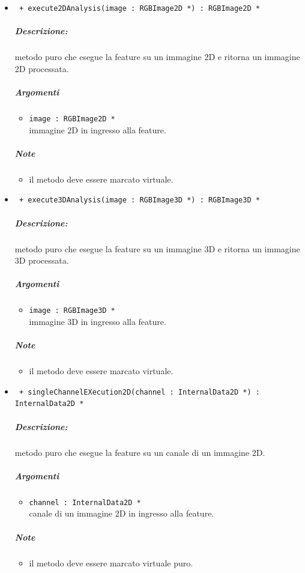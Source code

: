 \begin{itemize}
	\item \color{blue}\verb! + execute2DAnalysis(image : RGBImage2D *) : RGBImage2D *!
		\color{black}
		\subparagraph{Descrizione:} metodo puro che esegue la feature su un immagine 2D e ritorna un immagine 2D 						processata.
		\subparagraph{Argomenti}
			\begin{itemize}
				\item \color{RoyalPurple} \verb!image : RGBImage2D * ! \\ 
				\color{black} immagine 2D in ingresso alla feature.		
			\end{itemize}
		\subparagraph{Note}
			\begin{itemize}
				\item il metodo deve essere marcato virtuale.
			\end{itemize}
			
	\item \color{blue}\verb! + execute3DAnalysis(image : RGBImage3D *) : RGBImage3D *!
		\color{black}
		\subparagraph{Descrizione:} metodo puro che esegue la feature su un immagine 3D e ritorna un immagine 3D 						processata.
		\subparagraph{Argomenti}
			\begin{itemize}
				\item \color{RoyalPurple} \verb!image : RGBImage3D * ! \\ 
				\color{black} immagine 3D in ingresso alla feature.		
			\end{itemize}
		\subparagraph{Note}
			\begin{itemize}
				\item il metodo deve essere marcato virtuale.
			\end{itemize}
			
	\item \color{blue}\verb! + singleChannelEXecution2D(channel : InternalData2D *) : InternalData2D *!
		\color{black}
		\subparagraph{Descrizione:} metodo puro che esegue la feature su un canale di un immagine 2D.
		\subparagraph{Argomenti}
			\begin{itemize}
				\item \color{RoyalPurple} \verb!channel : InternalData2D * ! \\ 
				\color{black} canale di un immagine 2D in ingresso alla feature.		
			\end{itemize}
		\subparagraph{Note}
			\begin{itemize}
				\item il metodo deve essere marcato virtuale puro.
			\end{itemize}
			

\end{itemize}
